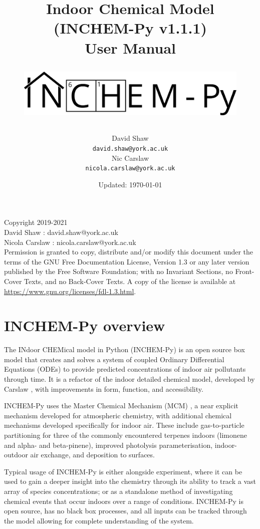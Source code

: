 \documentclass[a4paper]{refart}
\title{Indoor Chemical Model (INCHEM-Py v1.1.1) \\
User Manual\\
\begin{figure}
    \hspace{-0.25\textwidth}\hspace{0.25in}
    \includegraphics[width=\textwidth]{../logo/INCHEMPY_logo.png}
\end{figure}}
\author{
David Shaw\\
\texttt{david.shaw@york.ac.uk}\\
Nic Carslaw\\
\texttt{nicola.carslaw@york.ac.uk}\\
}
\date{Updated: \today}
\begin{document}
\maketitle


\newpage
\tableofcontents


\vspace*{\fill}

Copyright \textcopyright \hspace{1mm}2019-2021 \\
David Shaw : david.shaw@york.ac.uk\\
Nicola Carslaw : nicola.carslaw@york.ac.uk\\


Permission is granted to copy, distribute and/or modify this
document under the terms of the GNU Free Documentation License,
Version 1.3 or any later version published by the Free Software
Foundation; with no Invariant Sections, no Front-Cover Texts, and
no Back-Cover Texts.  A copy of the license is available at \url{https://www.gnu.org/licenses/fdl-1.3.html}.


\newpage
\section{INCHEM-Py overview}
The INdoor CHEMical model in Python (INCHEM-Py) is an open source box model that creates and solves a system of coupled Ordinary Differential Equations (ODEs) to provide predicted concentrations of indoor air pollutants through time. It is a refactor of the indoor detailed chemical model, developed by Carslaw  \cite{Carslaw2007}, with improvements in form, function, and accessibility.

INCHEM-Py uses the Master Chemical Mechanism (MCM) \cite{Jenkin1997,Saunders2003,Bloss2005,Jenkin2012,Jenkin2015}, a near explicit mechanism developed for atmospheric chemistry, with additional chemical mechanisms developed specifically for indoor air. These include gas-to-particle partitioning for three of the commonly encountered terpenes indoors (limonene and alpha- and beta-pinene), improved photolysis parameterisation, indoor-outdoor air exchange, and deposition to surfaces.

Typical usage of INCHEM-Py is either alongside experiment, where it can be used to gain a deeper insight into the chemistry through its ability to track a vast array of species concentrations; or as a standalone method of investigating chemical events that occur indoors over a range of conditions. INCHEM-Py is open source, has no black box processes, and all inputs can be tracked through the model allowing for complete understanding of the system.
\end{document}

